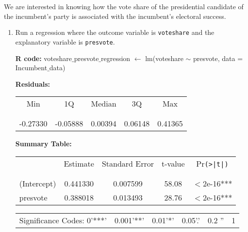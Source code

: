 \documentclass[12pt,letterpaper]{article}
\begin{document}
	\noindent We are interested in knowing how the vote share of the presidential candidate of the incumbent's party is associated with the incumbent's electoral success.
	\vspace{.25cm}
	\begin{enumerate}
		\item Run a regression where the outcome variable is \texttt{voteshare} and the explanatory variable is \texttt{presvote}.
		
		\-\hspace{0.5cm}\textbf{R code:} voteshare$\_$presvote$\_$regression $\gets$ lm(voteshare $\sim$ presvote, data = Incumbent$\_$data)
		\vspace{0.5cm}
		\begin{table}[h!]
			\-\hspace{0.5cm}\textbf{Residuals:}
			\centering
			\begin{tabular}{c c c c c}
				Min & 1Q & Median & 3Q & Max \\
				\\[-1.8ex] 
				\hline \\[-1.8ex]
				-0.27330 & -0.05888 & 0.00394 & 0.06148 & 0.41365\\
			\end{tabular}
		\end{table}
		\vspace{0.5cm}
		\begin{table}[h!]
			\-\hspace{0.5cm}\textbf{Summary Table:}
			\centering
			\begin{tabular}{l | c c c c }
				& Estimate & Standard Error & t-value & Pr\texttt{(>|t|)} \\
				\\[-1.8ex] 
				\hline \\[-1.8ex]
				(Intercept) & 0.441330 & 0.007599 & 58.08 & $<$2e-16*** \\
				presvote & 0.388018 & 0.013493 & 28.76 & $<$2e-16*** \\
			\end{tabular}
		\end{table}
		\vspace{0.5cm}
		\begin{table}[h!]
			\centering
			\begin{tabular}{c c c c c c}
				\\[-1.8ex] 
				Significance Codes: 0'***' & 0.001'**' & 0.01'*' & 0.05'.' & 0.2 '' & 1 \\
			\end{tabular}
		\end{table}
		

\end{enumerate}
\end{document}
